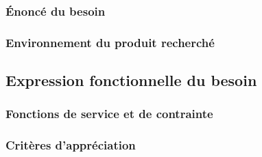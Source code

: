 \documentclass[a4paper]{article}
\begin{document}
\subsubsection{Énoncé du besoin}

\subsubsection{Environnement du produit recherché}


\subsection{Expression fonctionnelle du besoin}


\subsubsection{Fonctions de service et de contrainte}


\subsubsection{Critères d’appréciation}
\end{document}
